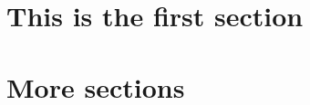 \documentclass[a4paper,english]{article}
\begin{document}
\mytitlepage



\section{This is the first section}






\section{More sections}





\section{}






\section{}




\section{}








\section{}






\section{}






\end{document}

